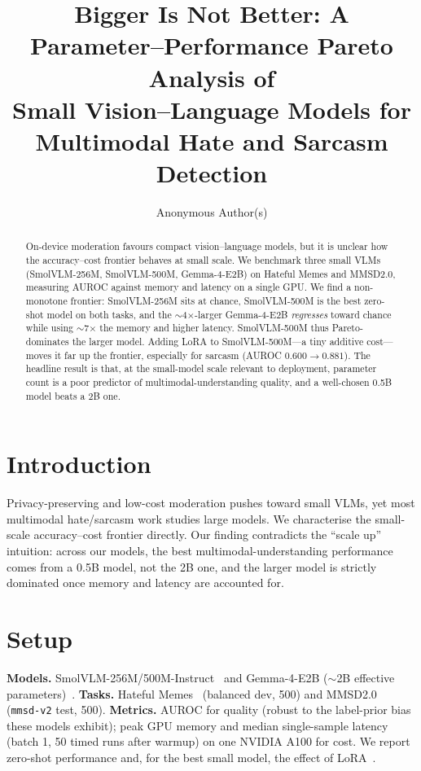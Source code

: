 \documentclass[sigconf,nonacm]{acmart}
\begin{document}
\title{Bigger Is Not Better: A Parameter--Performance Pareto Analysis of\\
Small Vision--Language Models for Multimodal Hate and Sarcasm Detection}

\author{Anonymous Author(s)}

\begin{abstract}
On-device moderation favours compact vision--language models, but it is unclear how the
accuracy--cost frontier behaves at small scale. We benchmark three small VLMs
(SmolVLM-256M, SmolVLM-500M, Gemma-4-E2B) on Hateful Memes and MMSD2.0, measuring AUROC
against memory and latency on a single GPU. We find a non-monotone frontier: SmolVLM-256M
sits at chance, SmolVLM-500M is the best zero-shot model on both tasks, and the
$\sim$4$\times$-larger Gemma-4-E2B \emph{regresses} toward chance while using
$\sim$7$\times$ the memory and higher latency. SmolVLM-500M thus Pareto-dominates the
larger model. Adding LoRA to SmolVLM-500M---a tiny additive cost---moves it far up the
frontier, especially for sarcasm (AUROC $0.600\to0.881$). The headline result is that, at
the small-model scale relevant to deployment, parameter count is a poor predictor of
multimodal-understanding quality, and a well-chosen 0.5B model beats a 2B one.
\end{abstract}


\maketitle

\section{Introduction}
Privacy-preserving and low-cost moderation pushes toward small VLMs, yet most multimodal
hate/sarcasm work studies large models. We characterise the small-scale accuracy--cost
frontier directly. Our finding contradicts the ``scale up'' intuition: across our models,
the best multimodal-understanding performance comes from a 0.5B model, not the 2B one,
and the larger model is strictly dominated once memory and latency are accounted for.

\section{Setup}
\textbf{Models.} SmolVLM-256M/500M-Instruct~\cite{marafioti2025smolvlm,laurencon2024idefics3}
and Gemma-4-E2B (\(\sim\)2B effective parameters)~\cite{gemma2025}. \textbf{Tasks.}
Hateful Memes~\cite{kiela2020hateful} (balanced dev, 500) and MMSD2.0~\cite{qin2023mmsd2}
(\texttt{mmsd-v2} test, 500). \textbf{Metrics.} AUROC for quality (robust to the label-prior
bias these models exhibit); peak GPU memory and median single-sample latency
(batch 1, 50 timed runs after warmup) on one NVIDIA A100 for cost. We report zero-shot
performance and, for the best small model, the effect of LoRA~\cite{hu2022lora}.
\end{document}

